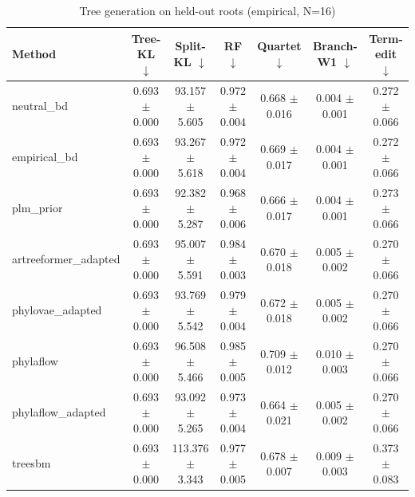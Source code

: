 \begin{table}[t]\centering
\caption{Tree generation on held-out roots (empirical, N=16)}
\begin{tabular}{lcccccc}
\toprule
Method & Tree-KL $\downarrow$ & Split-KL $\downarrow$ & RF $\downarrow$ & Quartet $\downarrow$ & Branch-W1 $\downarrow$ & Term-edit $\downarrow$ \\
\midrule
neutral\_bd & 0.693 $\pm$ 0.000 & 93.157 $\pm$ 5.605 & 0.972 $\pm$ 0.004 & 0.668 $\pm$ 0.016 & 0.004 $\pm$ 0.001 & 0.272 $\pm$ 0.066 \\
empirical\_bd & 0.693 $\pm$ 0.000 & 93.267 $\pm$ 5.618 & 0.972 $\pm$ 0.004 & 0.669 $\pm$ 0.017 & 0.004 $\pm$ 0.001 & 0.272 $\pm$ 0.066 \\
plm\_prior & 0.693 $\pm$ 0.000 & 92.382 $\pm$ 5.287 & 0.968 $\pm$ 0.006 & 0.666 $\pm$ 0.017 & 0.004 $\pm$ 0.001 & 0.273 $\pm$ 0.066 \\
artreeformer\_adapted & 0.693 $\pm$ 0.000 & 95.007 $\pm$ 5.591 & 0.984 $\pm$ 0.003 & 0.670 $\pm$ 0.018 & 0.005 $\pm$ 0.002 & 0.270 $\pm$ 0.066 \\
phylovae\_adapted & 0.693 $\pm$ 0.000 & 93.769 $\pm$ 5.542 & 0.979 $\pm$ 0.004 & 0.672 $\pm$ 0.018 & 0.005 $\pm$ 0.002 & 0.270 $\pm$ 0.066 \\
phylaflow & 0.693 $\pm$ 0.000 & 96.508 $\pm$ 5.466 & 0.985 $\pm$ 0.005 & 0.709 $\pm$ 0.012 & 0.010 $\pm$ 0.003 & 0.270 $\pm$ 0.066 \\
phylaflow\_adapted & 0.693 $\pm$ 0.000 & 93.092 $\pm$ 5.265 & 0.973 $\pm$ 0.004 & 0.664 $\pm$ 0.021 & 0.005 $\pm$ 0.002 & 0.270 $\pm$ 0.066 \\
treesbm & 0.693 $\pm$ 0.000 & 113.376 $\pm$ 3.343 & 0.977 $\pm$ 0.005 & 0.678 $\pm$ 0.007 & 0.009 $\pm$ 0.003 & 0.373 $\pm$ 0.083 \\
\bottomrule
\end{tabular}
\end{table}